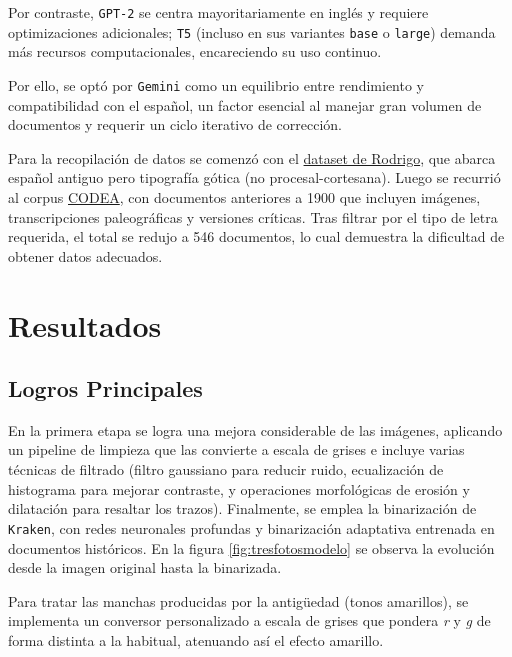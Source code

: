 \documentclass[11pt,a4paper]{article}
\begin{document}
Por contraste, \texttt{GPT-2} se centra mayoritariamente en inglés y requiere optimizaciones adicionales; \texttt{T5} (incluso en sus variantes \texttt{base} o \texttt{large}) demanda más recursos computacionales, encareciendo su uso continuo.

Por ello, se optó por \texttt{Gemini} como un equilibrio entre rendimiento y compatibilidad con el español, un factor esencial al manejar gran volumen de documentos y requerir un ciclo iterativo de corrección.

Para la recopilación de datos se comenzó con el \href{https://zenodo.org/records/1490009/files/Rodrigo%20corpus%201.0.0.tar.gz?download=1}{dataset de Rodrigo}, que abarca español antiguo pero tipografía gótica (no procesal-cortesana). Luego se recurrió al corpus \href{https://corpuscodea.es/}{CODEA}, con documentos anteriores a 1900 que incluyen imágenes, transcripciones paleográficas y versiones críticas. Tras filtrar por el tipo de letra requerida, el total se redujo a 546 documentos, lo cual demuestra la dificultad de obtener datos adecuados.\\

\section{Resultados}
\subsection{Logros Principales}

En la primera etapa se logra una mejora considerable de las imágenes, aplicando un pipeline de limpieza que las convierte a escala de grises e incluye varias técnicas de filtrado (filtro gaussiano para reducir ruido, ecualización de histograma para mejorar contraste, y operaciones morfológicas de erosión y dilatación para resaltar los trazos). Finalmente, se emplea la binarización de \texttt{Kraken}, con redes neuronales profundas y binarización adaptativa entrenada en documentos históricos. En la figura \ref{fig:tresfotosmodelo} se observa la evolución desde la imagen original hasta la binarizada.

Para tratar las manchas producidas por la antigüedad (tonos amarillos), se implementa un conversor personalizado a escala de grises que pondera \textit{r} y \textit{g} de forma distinta a la habitual, atenuando así el efecto amarillo.
\end{document}

